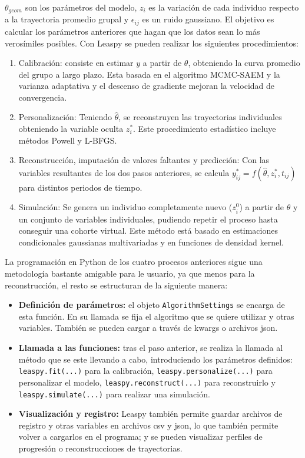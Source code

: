 	$\theta_{geom}$ son los parámetros del modelo, $z_{i}$ es la variación de cada individuo respecto a la trayectoria promedio grupal y $\epsilon_{ij}$ es un ruido gaussiano. El objetivo es calcular los parámetros anteriores que hagan que los datos sean lo más verosímiles posibles. Con Leaspy se pueden realizar los siguientes procedimientos:
	\begin{enumerate}
		\item Calibración: consiste en estimar $y$ a partir de $\theta$, obteniendo la curva promedio del grupo a largo plazo. Esta basada en el algoritmo MCMC-SAEM y la varianza adaptativa y el descenso de gradiente mejoran la velocidad de convergencia.
		\item Personalización: Teniendo $\hat{\theta}$, se reconstruyen las trayectorias individuales obteniendo la variable oculta $z_{i}^{*}$. Este procedimiento estadístico incluye métodos Powell y L-BFGS.
		\item Reconstrucción, imputación de valores faltantes y predicción: Con las variables resultantes de los dos pasos anteriores, se calcula $y_{ij}^{*}=f(\hat{\theta}, z_{i}^{*}, t_{ij})$ para distintos periodos de tiempo.
		\item Simulación: Se genera un individuo completamente nuevo ($z_{i}^{0}$) a partir de $\hat{\theta}$ y un conjunto de variables individuales, pudiendo repetir el proceso hasta conseguir una cohorte virtual. Este método está basado en estimaciones condicionales gaussianas multivariadas y en funciones de densidad kernel.	
	\end{enumerate}
	
	La programación en Python de los cuatro procesos anteriores sigue una metodología bastante amigable para le usuario, ya que menos para la reconstrucción, el resto se estructuran de la siguiente manera:
	\begin{itemize}
		\item \textbf{Definición de parámetros:} el objeto \texttt{AlgorithmSettings} se encarga de esta función. En su llamada se fija el algoritmo que se quiere utilizar y otras variables. También se pueden cargar a través de kwargs o archivos json.
		\item \textbf{Llamada a las funciones:} tras el paso anterior, se realiza la llamada al método que se este llevando a cabo, introduciendo los parámetros definidos: \texttt{leaspy.fit(...)} para la calibración, \texttt{leaspy.personalize(...)} para personalizar el modelo, \texttt{leaspy.reconstruct(...)} para reconstruirlo y\\\texttt{leaspy.simulate(...)} para realizar una simulación.
		\item \textbf{Visualización y registro:} Leaspy también permite guardar archivos de registro y otras variables en archivos csv y json, lo que también permite volver a cargarlos en el programa; y se pueden visualizar perfiles de progresión o reconstrucciones de trayectorias.
	\end{itemize}
	
